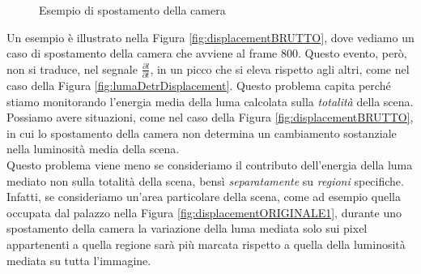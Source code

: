 \begin{figure}[tb]
	\centering
	\caption{Esempio di spostamento della camera}
	\label{fig:testiDISPLACEMENT1}
\end{figure}
Un esempio \`e illustrato nella Figura \ref{fig:displacementBRUTTO}, dove vediamo un caso di spostamento della camera che avviene al frame $800$.
Questo evento, per\`o, non si traduce, nel segnale $\frac{\partial l}{\partial t}$, in un picco che si eleva rispetto agli altri, come nel caso della Figura \ref{fig:lumaDetrDisplacement}.
Questo problema capita perch\'e stiamo monitorando l'energia media della luma calcolata sulla \textit{totalit\`a} della scena.
Possiamo avere situazioni, come nel caso della Figura \ref{fig:displacementBRUTTO}, in cui lo spostamento della camera non determina un cambiamento sostanziale nella luminosit\`a media della scena.\\
Questo problema viene meno se consideriamo il contributo dell'energia della luma mediato non sulla totalit\`a della scena, bens\`i \textit{separatamente} su \textit{regioni} specifiche.
Infatti, se consideriamo un'area particolare della scena, come ad esempio quella occupata dal palazzo nella Figura \ref{fig:displacementORIGINALE1}, durante uno spostamento della camera la variazione della luma mediata solo sui pixel appartenenti a quella regione sar\`a pi\`u marcata rispetto a quella della luminosit\`a mediata su tutta l'immagine.\\
